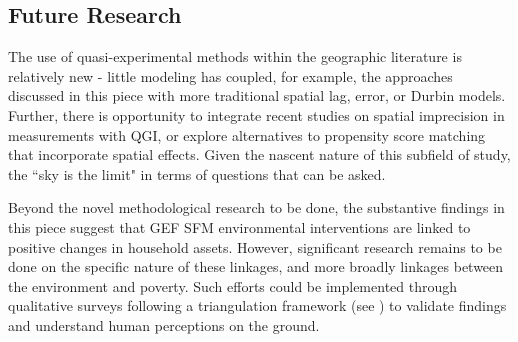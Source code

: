 \documentclass[sustainability,article,submit,moreauthors,pdftex]{Definitions/mdpi}
\begin{document}
\subsection{Future Research}
The use of quasi-experimental methods within the geographic literature is relatively new -  little modeling has coupled, for example, the approaches discussed in this piece with more traditional spatial lag, error, or Durbin models.  Further, there is opportunity to integrate recent studies on spatial imprecision in measurements with QGI, or explore alternatives to propensity score matching that incorporate spatial effects.  Given the nascent nature of this subfield of study, the ``sky is the limit" in terms of questions that can be asked.
\par
Beyond the novel methodological research to be done, the substantive findings in this piece suggest that GEF SFM environmental interventions are linked to positive changes in household assets.  However, significant research remains to be done on the specific nature of these linkages, and more broadly linkages between the environment and poverty.  Such efforts could be implemented through qualitative surveys following a triangulation framework (see \cite{Carugi2016ExperiencesFacility}) to validate findings and understand human perceptions on the ground.  





\end{document}
